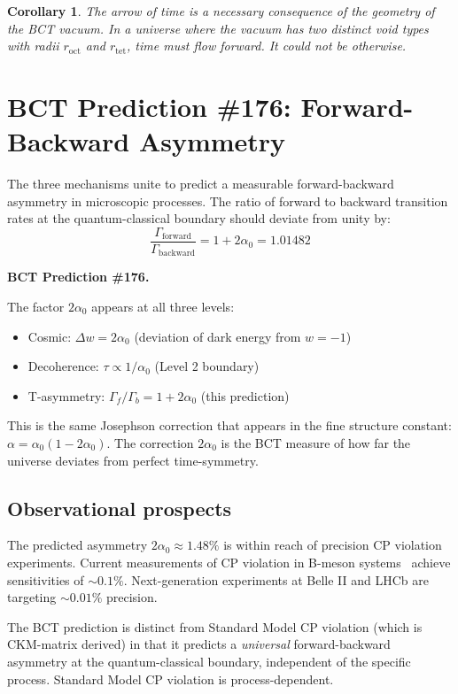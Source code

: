 \documentclass[aps,prl,twocolumn,superscriptaddress,floatfix]{revtex4-2}
\newtheorem{corollary}{Corollary}
\newcommand{\roct}{r_{\mathrm{oct}}}
\newcommand{\rtet}{r_{\mathrm{tet}}}
\newcommand{\azero}{\alpha_0}
\begin{document}
\begin{corollary}
The arrow of time is a necessary consequence of the 
geometry of the BCT vacuum. In a universe where the 
vacuum has two distinct void types with radii $\roct$ 
and $\rtet$, time must flow forward. It could not 
be otherwise.
\end{corollary}

\section{BCT Prediction \#176: Forward-Backward Asymmetry}

The three mechanisms unite to predict a measurable 
forward-backward asymmetry in microscopic processes. 
The ratio of forward to backward transition rates 
at the quantum-classical boundary should deviate 
from unity by:
\begin{equation}
\boxed{\frac{\Gamma_{\mathrm{forward}}}{\Gamma_{\mathrm{backward}}} 
= 1 + 2\azero = 1.01482}
\end{equation}

\textbf{BCT Prediction \#176.}

The factor $2\azero$ appears at all three levels:
\begin{itemize}
\item Cosmic: $\Delta w = 2\azero$ (deviation of dark energy from $w=-1$)
\item Decoherence: $\tau \propto 1/\azero$ (Level 2 boundary)
\item T-asymmetry: $\Gamma_f/\Gamma_b = 1 + 2\azero$ (this prediction)
\end{itemize}

This is the same Josephson correction that appears in 
the fine structure constant: $\alpha = \azero(1-2\azero)$. 
The correction $2\azero$ is the BCT measure of how far 
the universe deviates from perfect time-symmetry.

\subsection{Observational prospects}

The predicted asymmetry $2\azero \approx 1.48\%$ is 
within reach of precision CP violation experiments. 
Current measurements of CP violation in B-meson 
systems~\cite{Belle2021} achieve sensitivities of 
$\sim 0.1\%$. Next-generation experiments at Belle II 
and LHCb are targeting $\sim 0.01\%$ precision.

The BCT prediction is distinct from Standard Model 
CP violation (which is CKM-matrix derived) in that 
it predicts a \emph{universal} forward-backward 
asymmetry at the quantum-classical boundary, 
independent of the specific process. Standard Model 
CP violation is process-dependent.
\end{document}
